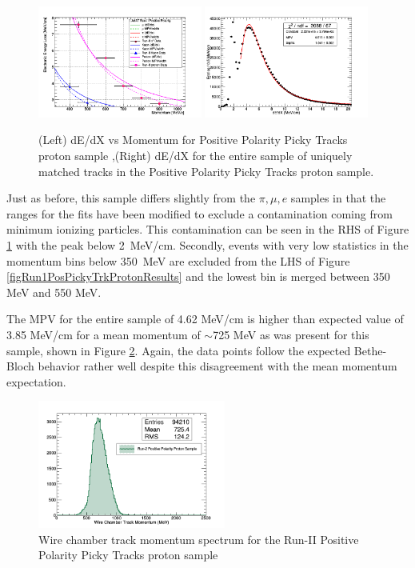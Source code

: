 \begin{figure}[htb]
\centering
\includegraphics[width=0.48\textwidth]{images/dEdXvsMomentumPosPolRun2ProtonFineBin.png}
\includegraphics[width=0.48\textwidth]{images/dEdXPosPolRun2Proton.png}
\caption{(Left) dE/dX vs Momentum for Positive Polarity Picky Tracks proton sample ,(Right) dE/dX for the entire sample of uniquely matched tracks in the Positive Polarity Picky Tracks proton sample.}
\label{fig:Run2PosPickyTrkProtonResults}
\end{figure}

Just as before, this sample differs slightly from the $\pi, \mu, e$ samples in that the ranges for the fits have been modified to exclude a contamination coming from minimum ionizing particles. This contamination can be seen in the RHS of Figure \ref{fig:Run2PosPickyTrkProtonResults} with the peak below 2~MeV/cm. Secondly, events with very low statistics in the momentum bins below 350~MeV are excluded from the LHS of Figure \ref{figRun1PosPickyTrkProtonResults} and the lowest bin is merged between 350 MeV and 550 MeV.

The MPV for the entire sample of 4.62 MeV/cm is higher than expected value of 3.85 MeV/cm for a mean momentum of $\sim$725  MeV as was present for this sample, shown in Figure \ref{fig:Run1PosPickyTrkProtonMomentumSpec}. Again, the data points follow the expected Bethe-Bloch behavior rather well despite this disagreement with the mean momentum expectation.

\begin{figure}[htb]
\centering
\includegraphics[width=0.55\textwidth]{images/WCTrkMomentumRun2PosProton.png}
\caption{Wire chamber track momentum spectrum for the Run-II Positive Polarity Picky Tracks proton sample  }
\label{fig:Run1PosPickyTrkProtonMomentumSpec}
\end{figure}

